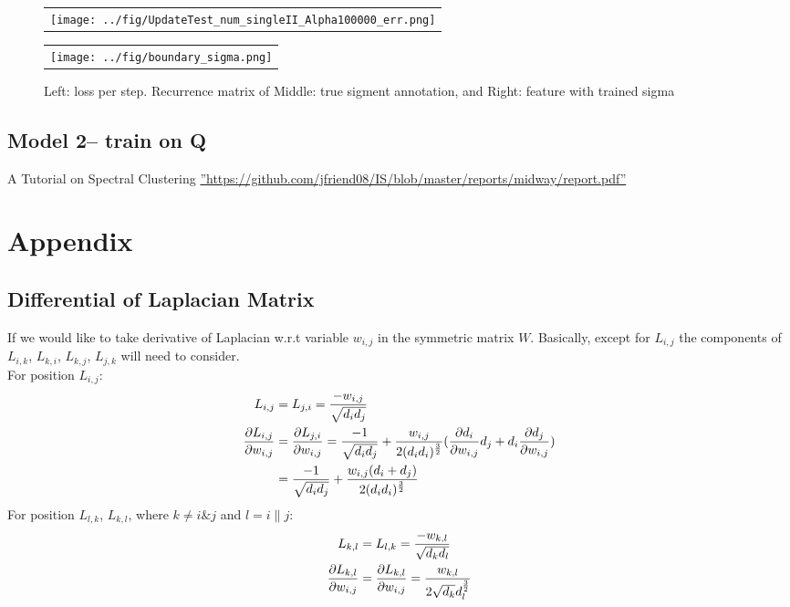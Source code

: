 \documentclass[final]{siamltexmm}
\begin{document}
\begin{figure}[H]
\centering
\begin{subfigure}
  \begin{tabular}{c}
  \texttt{[image: ../fig/UpdateTest\_num\_singleII\_Alpha100000\_err.png]}
  \end{tabular}{}
\end{subfigure}
  \begin{tabular}{c}
  \texttt{[image: ../fig/boundary\_sigma.png]}
  \end{tabular}{}
\begin{subfigure}
\end{subfigure}
\caption{Left: loss per step. Recurrence matrix of Middle: true sigment annotation, and Right: feature with trained sigma }
\end{figure}

\subsection{Model 2-- train on Q}

\begin{thebibliography}{10}
 {\sc A Tutorial on Spectral Clustering}
 \hyperref[baseline]{''https://github.com/jfriend08/IS/blob/master/reports/midway/report.pdf''}
\end{thebibliography}

\section{Appendix}
\subsection{Differential of Laplacian Matrix}
If we would like to take derivative of Laplacian w.r.t variable $w_{i,j}$ in the symmetric matrix $W$. Basically, except for $L_{i,j}$ the components of $L_{i,k}$, $L_{k,i}$, $L_{k,j}$, $L_{j,k}$ will need to consider.\\
For position $L_{i,j}$:
\begin{equation}
\begin{aligned}
L_{i,j} &= L_{j,i} =  {-w_{i,j} \over \sqrt{d_id_j}} \\
{\partial L_{i,j} \over \partial w_{i,j}} &= {\partial L_{j,i} \over \partial w_{i,j}} = {-1 \over \sqrt{d_id_j}} + {w_{i,j} \over 2(d_id_i)^{3\over 2}}({\partial d_i \over \partial w_{i,j}}d_j + d_i{\partial d_j \over \partial w_{i,j}}) \\
&= {-1 \over \sqrt{d_id_j}} + {w_{i,j}(d_i+d_j) \over 2(d_id_i)^{3\over 2}}
\end{aligned}
\end{equation}
For position $L_{l,k}$, $L_{k,l}$, where $k \neq i \& j$ and $l = i\|j$:
\begin{equation}
\begin{aligned}
L_{k,l} &= L_{l,k} =  {-w_{k,l} \over \sqrt{d_kd_l}} \\
{\partial L_{k,l} \over \partial w_{i,j}} &= {\partial L_{k,l} \over \partial w_{i,j}} = {w_{k,l} \over 2\sqrt{d_k}d_l^{3\over2}}
\end{aligned}
\end{equation}
\end{document}
